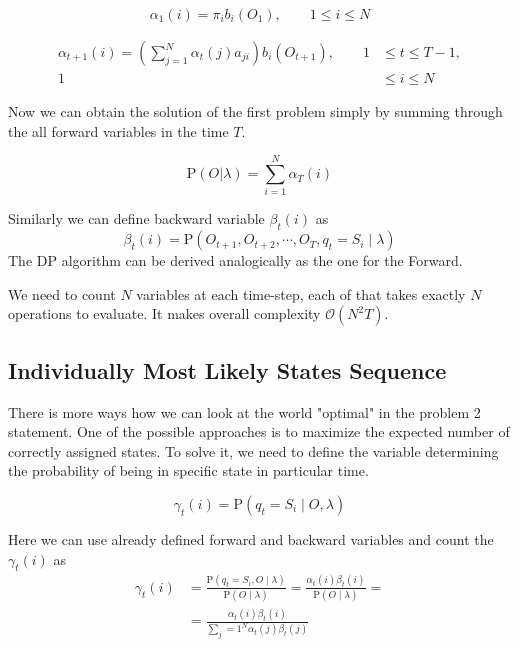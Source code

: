 \documentclass[thesis=M,english]{FITthesis}[2012/10/20]
\begin{document}
\begin{equation}
\alpha_1(i) = \pi_i b_i(O_1), \qquad 1 \leq i \leq N
\end{equation}

\begin{equation}
\begin{aligned}
\alpha_{t+1}(i) = \left( \sum_{j=1}^N \alpha_t(j) a_{ji} \right) b_i(O_{t+1}), \qquad 1& \leq t \leq T - 1, \\ 
                                                                                 1& \leq i \leq N		\end{aligned}
\end{equation}

  
Now we can obtain the solution of the first problem simply by summing through the all forward variables in the time $T$.

\begin{equation}
\mathrm{P}(O|\lambda) = \sum_{i=1}^N \alpha_T(i)
\end{equation} 

Similarly we can define backward variable $\beta_t(i)$ as
\begin{equation}
\beta_t(i) = \mathrm{P}(O_{t+1},O_{t+2},\cdots,O_T,q_t = S_i \mid \lambda ) 
\end{equation}
The DP algorithm can be derived analogically as the one for the Forward.

We need to count $N$ variables at each time-step, each of that takes exactly $N$ operations to evaluate. It makes overall complexity $\mathcal{O}(N^2T)$.    

\subsection{Individually Most Likely States Sequence}
There is more ways how we can look at the world "optimal" in the problem 2 statement. One of the possible approaches is to maximize the expected number of correctly assigned states. To solve it, we need to define the variable determining the probability of being in specific state in particular time.

\begin{equation}
\gamma_t(i) = \mathrm{P}(q_t = S_i \mid O,\lambda ) 
\end{equation}

Here we can use already defined forward and backward variables and count the $\gamma_t(i)$ as
\begin{equation}
\begin{aligned}
\gamma_t(i) &= \frac{ \mathrm{P}( q_t = S_i, O \mid \lambda )}{ \mathrm{P}( O \mid \lambda )} =
               \frac{  \alpha_t(i) \beta_t(i) }{ \mathrm{P}( O \mid \lambda )} = \\
            &= \frac{  \alpha_t(i) \beta_t(i) }{ \sum_j=1^N \alpha_t(j) \beta_t(j) } 
\end{aligned}
\end{equation}
\end{document}
